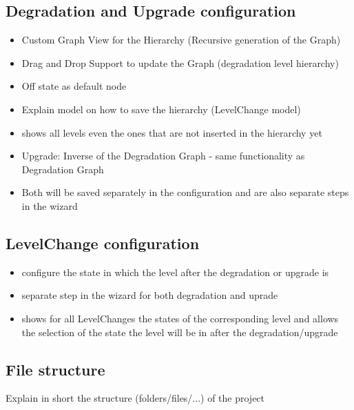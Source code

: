 \subsection{Degradation and Upgrade configuration}
\begin{itemize}
    \item Custom Graph View for the Hierarchy (Recursive generation of the Graph)
    \item Drag and Drop Support to update the Graph (degradation level hierarchy)
    \item Off state as default node
    \item Explain model on how to save the hierarchy (LevelChange model) 
    \item shows all levels even the ones that are not inserted in the hierarchy yet
    \item Upgrade: Inverse of the Degradation Graph - same functionality as Degradation Graph
    \item Both will be saved separately in the configuration and are also separate steps in the wizard
\end{itemize}

\subsection{LevelChange configuration}
\begin{itemize}
    \item configure the state in which the level after the degradation or upgrade is
    \item separate step in the wizard for both degradation and uprade
    \item shows for all LevelChanges the states of the corresponding level and allows the selection of the state the level will be in after the degradation/upgrade 
\end{itemize}

\subsection{File structure}
Explain in short the structure (folders/files/...) of the project
